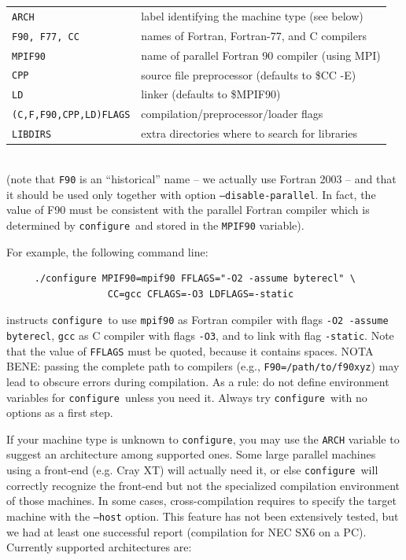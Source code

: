 \documentclass[12pt,a4paper]{article}
\def\configure{\texttt{configure}}
\begin{document}
\begin{tabular}{ll}
\texttt{ARCH}& label identifying the machine type (see below)\\
\texttt{F90, F77, CC} &names of Fortran, Fortran-77, and C compilers\\
\texttt{MPIF90} &       name of parallel Fortran 90 compiler (using MPI)\\
\texttt{CPP} &          source file preprocessor (defaults to \$CC -E)\\
\texttt{LD} &           linker (defaults to \$MPIF90)\\
\texttt{(C,F,F90,CPP,LD)FLAGS}& compilation/preprocessor/loader flags\\
\texttt{LIBDIRS}&     extra directories where to search for libraries\\
\end{tabular}\\
(note that \texttt{F90} is an ``historical'' name -- we actually use
Fortran 2003 -- and that it should be used only together with option
\texttt{--disable-parallel}. In fact, the value of F90 must be
consistent with the parallel Fortran compiler which is determined by 
\configure\ and stored in the \texttt{MPIF90} variable).

For example, the following command line:
\begin{verbatim}
     ./configure MPIF90=mpif90 FFLAGS="-O2 -assume byterecl" \
                  CC=gcc CFLAGS=-O3 LDFLAGS=-static
\end{verbatim}
instructs \configure\ to use \texttt{mpif90} as Fortran compiler
with flags \texttt{-O2 -assume byterecl}, \texttt{gcc} as C compiler with
flags \texttt{-O3}, and to link with flag \texttt{-static}.
Note that the value of \texttt{FFLAGS} must be quoted, because it contains
spaces. NOTA BENE: passing the complete path to compilers (e.g.,
\texttt{F90=/path/to/f90xyz}) may lead to obscure errors during
compilation. As a rule: do not define environment variables for
\configure\ unless you need it. Always try
\configure\ with no options as a first step.

If your machine type is unknown to \configure, you may use the
\texttt{ARCH}
variable to suggest an architecture among supported ones. Some large
parallel machines using a front-end (e.g. Cray XT) will actually
need it, or else \configure\ will correctly recognize the front-end
but not the specialized compilation environment of those machines.
In some cases, cross-compilation requires to specify the target machine with the
\texttt{--host} option. This feature has not been extensively
tested, but we had at least one successful report (compilation
for NEC SX6 on a PC). Currently supported architectures are:
\end{document}
